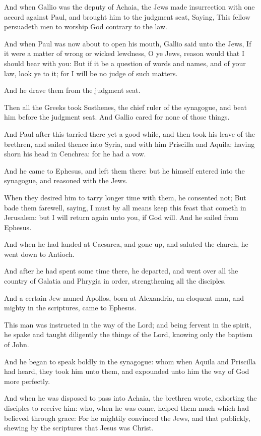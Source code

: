 \Verse And when Gallio was the deputy of Achaia, the Jews made insurrection with one accord against Paul, and brought him to the judgment seat, \Verse Saying, This fellow persuadeth men to worship God contrary to the law.

\Verse And when Paul was now about to open his mouth, Gallio said unto the Jews, If it were a matter of wrong or wicked lewdness, O ye Jews, reason would that I should bear with you: \Verse But if it be a question of words and names, and of your law, look ye to it; for I will be no judge of such matters.

\Verse And he drave them from the judgment seat.

\Verse Then all the Greeks took Sosthenes, the chief ruler of the synagogue, and beat him before the judgment seat. And Gallio cared for none of those things.

\Verse And Paul after this tarried there yet a good while, and then took his leave of the brethren, and sailed thence into Syria, and with him Priscilla and Aquila; having shorn his head in Cenchrea: for he had a vow.

\Verse And he came to Ephesus, and left them there: but he himself entered into the synagogue, and reasoned with the Jews.

\Verse When they desired him to tarry longer time with them, he consented not; \Verse But bade them farewell, saying, I must by all means keep this feast that cometh in Jerusalem: but I will return again unto you, if God will. And he sailed from Ephesus.

\Verse And when he had landed at Caesarea, and gone up, and saluted the church, he went down to Antioch.

\Verse And after he had spent some time there, he departed, and went over all the country of Galatia and Phrygia in order, strengthening all the disciples.

\Verse And a certain Jew named Apollos, born at Alexandria, an eloquent man, and mighty in the scriptures, came to Ephesus.

\Verse This man was instructed in the way of the Lord; and being fervent in the spirit, he spake and taught diligently the things of the Lord, knowing only the baptism of John.

\Verse And he began to speak boldly in the synagogue: whom when Aquila and Priscilla had heard, they took him unto them, and expounded unto him the way of God more perfectly.

\Verse And when he was disposed to pass into Achaia, the brethren wrote, exhorting the disciples to receive him: who, when he was come, helped them much which had believed through grace: \Verse For he mightily convinced the Jews, and that publickly, shewing by the scriptures that Jesus was Christ.


